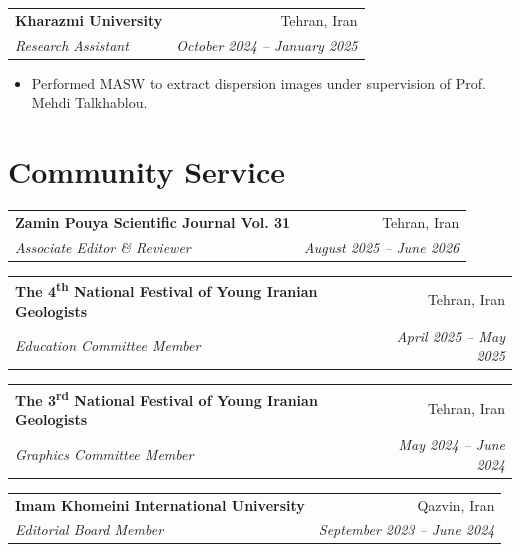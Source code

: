 \documentclass[letterpaper,10pt]{article}
\makeatletter
\newcommand{\resitem}[1]{\item #1 \vspace{-1pt}}
\newcommand{\ressubheading}[4]{%
	\begin{tabular*}{\textwidth}{l@{\cftdotfill{\cftsecdotsep}\extracolsep{\fill}}r}
		\textbf{#1} & #2 \\
		\textit{#3} & \textit{#4} \\
	\end{tabular*}\vspace{-2pt}
}
\makeatother
\begin{document}
	\ressubheading{Kharazmi University}{Tehran, Iran}{Research Assistant}{October 2024 – January 2025}
	\begin{itemize}[topsep=1pt,partopsep=0pt,itemsep=1pt,parsep=0pt]
		\resitem{Performed MASW to extract dispersion images under supervision of Prof. Mehdi Talkhablou.}
	\end{itemize}

	\vspace{-0.65em}
		
	\section{Community Service}
	\ressubheading{Zamin Pouya Scientific Journal Vol. 31}{Tehran, Iran}{Associate Editor \& Reviewer}{August 2025 – June 2026}

	\ressubheading{The 4\textsuperscript{th} National Festival of Young Iranian Geologists}{Tehran, Iran}{Education Committee Member}{April 2025 – May 2025}

	\ressubheading{The 3\textsuperscript{rd} National Festival of Young Iranian Geologists}{Tehran, Iran}{Graphics Committee Member}{May 2024 – June 2024}

	\ressubheading{Imam Khomeini International University}{Qazvin, Iran}{Editorial Board Member}{September 2023 – June 2024}

	\vspace{-0.65em}
	
	
\end{document}
